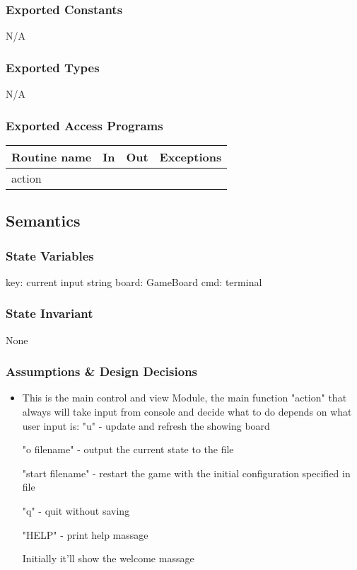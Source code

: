 \documentclass[12pt]{article}
\begin{document}
\subsubsection* {Exported Constants}

N/A

\subsubsection* {Exported Types}

N/A

\subsubsection* {Exported Access Programs}

\begin{tabular}{| l | l | l | p{5cm} |}
\hline
\textbf{Routine name} & \textbf{In} & \textbf{Out} & \textbf{Exceptions}\\
\hline
action & & & \\
\hline
\end{tabular}

\subsection* {Semantics}

\subsubsection* {State Variables}

key: current input string
board: GameBoard
cmd: terminal

\subsubsection* {State Invariant}

None

\subsubsection* {Assumptions \& Design Decisions}

\begin{itemize}
\item This is the main control and view Module, the main function "action" that always will
take input from console and decide what to do depends on what user input is:
"u" - update and refresh the showing board

"o filename" - output the current state to the file

"start filename" - restart the game with the initial configuration specified in file

"q" - quit without saving

"HELP" - print help massage

Initially it'll show the welcome massage
\end{itemize}
\end{document}
